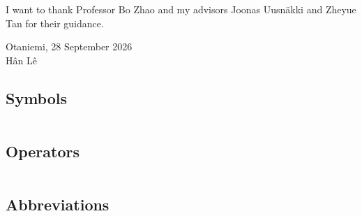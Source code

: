 \documentclass[english, 12pt, a4paper, elec, utf8, a-2b, online]{aaltothesis}
\begin{document}
\dothesispagenumbering{}

I want to thank Professor Bo Zhao and my advisors Joonas Uusnäkki and Zheyue Tan for their guidance.

\vspace{5cm}
Otaniemi, 28 September 2026\\

\vspace{5mm}
{\hfill Hân Lê \hspace{1cm}}

\newpage


\thesistableofcontents


\subsection*{Symbols}

\begin{tabular}{ll}

\end{tabular}

\subsection*{Operators}

\begin{tabular}{ll}

\end{tabular}

\subsection*{Abbreviations}
\end{document}
